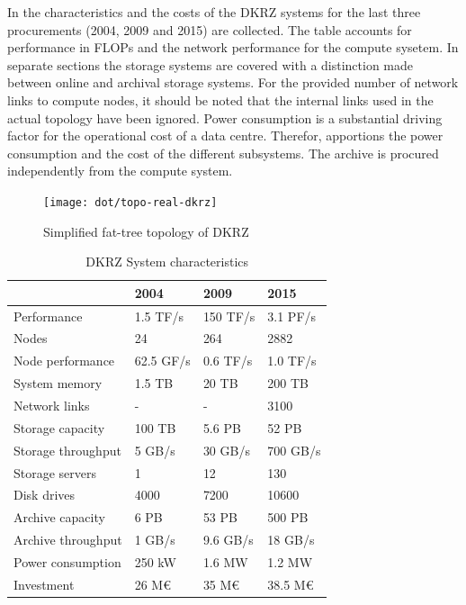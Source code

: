 \documentclass{../../template/esiwace-report}
\begin{document}
In  the characteristics and the costs of the DKRZ systems for the last three procurements (2004, 2009 and 2015) are collected.
The table accounts for performance in FLOPs and the network performance for the compute sysetem. In separate sections the storage systems are covered with a distinction made between online and archival storage systems.
For the provided number of network links to compute nodes, it should be noted that the internal links used in the actual topology have been ignored.
Power consumption is a substantial driving factor for the operational cost of a data centre.
Therefor,  apportions the power consumption and the cost of the different subsystems. The archive is procured independently from the compute system.



\begin{figure} [htbp]
	\centering
	\texttt{[image: dot/topo-real-dkrz]}
	\caption{Simplified fat-tree topology of DKRZ}
	\label{fig:dkrz topology}
\end{figure}



\begin{table} [htbp]
\centering
\small
\begin{tabular}{|l||lll|}
	\hline
	                   & 2004      & 2009      & 2015        \\ \hline
	Performance        & 1.5 TF/s  & 150 TF/s  & 3.1 PF/s    \\
	Nodes              & 24        & 264       & 2882        \\
	Node performance   & 62.5 GF/s & 0.6 TF/s  & 1.0 TF/s    \\
	System memory      & 1.5 TB    & 20 TB     & 200 TB      \\
	Network links      & -         & -         & 3100        \\ \hline
	Storage	capacity   & 100 TB    & 5.6 PB    & 52 PB       \\
	Storage	throughput & 5 GB/s    & 30 GB/s   & 700 GB/s    \\
	Storage servers    & 1         & 12        & 130         \\
	Disk drives        & 4000      & 7200      & 10600       \\ \hline
	Archive	capacity   & 6 PB      & 53 PB     & 500 PB      \\
	Archive	throughput & 1 GB/s    & 9.6 GB/s  & 18 GB/s     \\ \hline
	Power consumption  & 250 kW    & 1.6 MW    & 1.2 MW      \\
	Investment         & 26 M\euro & 35 M\euro & 38.5 M\euro \\ \hline
\end{tabular}
 \caption{DKRZ System characteristics}
 \label{tbl:dkrz characteristics}
 \vspace*{-0.35cm}
\end{table}
\end{document}
